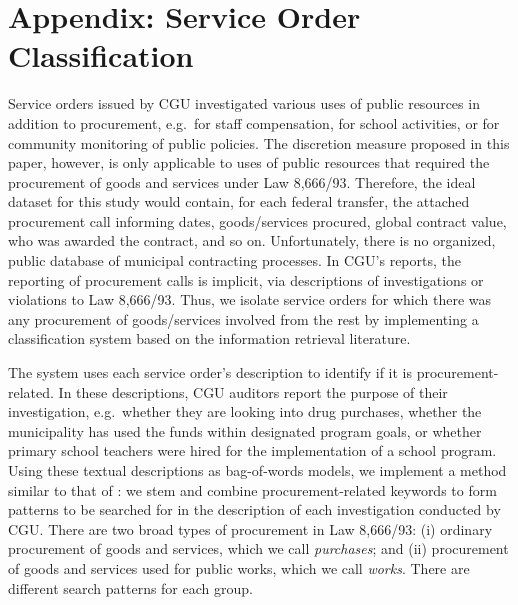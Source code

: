 \documentclass[11pt]{article}
\begin{document}




\clearpage

\appendix

\section{Appendix: Service Order Classification} \label{sec:appendixA}

Service orders issued by CGU investigated various uses of public resources in addition to procurement, e.g.~for staff compensation, for school activities, or for community monitoring of public policies. The discretion measure proposed in this paper, however, is only applicable to uses of public resources that required the procurement of goods and services under Law 8,666/93. Therefore, the ideal dataset for this study would contain, for each federal transfer, the attached procurement call informing dates, goods/services procured, global contract value, who was awarded the contract, and so on. Unfortunately, there is no organized, public database of municipal contracting processes. In CGU's reports, the reporting of procurement calls is implicit, via descriptions of investigations or violations to Law 8,666/93. Thus, we isolate service orders for which there was any procurement of goods/services involved from the rest by implementing a classification system based on the information retrieval literature.

The system uses each service order's description to identify if it is procurement-related. In these descriptions, CGU auditors report the purpose of their investigation, e.g.~whether they are looking into drug purchases, whether the municipality has used the funds within designated program goals, or whether primary school teachers were hired for the implementation of a school program. Using these textual descriptions as bag-of-words models, we implement a method similar to that of \citet{HopkinsMethodAutomatedNonparametric2009}: we stem and combine procurement-related keywords to form patterns to be searched for in the description of each investigation conducted by CGU. There are two broad types of procurement in Law 8,666/93: (i) ordinary procurement of goods and services, which we call \emph{purchases}; and (ii) procurement of goods and services used for public works, which we call \emph{works}. There are different search patterns for each group.
\end{document}
